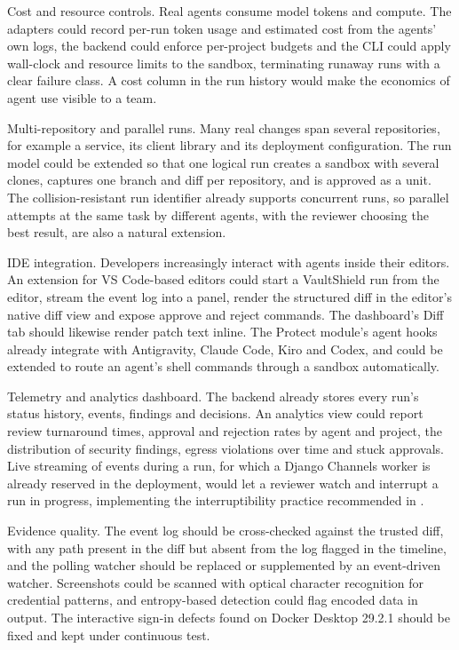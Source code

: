 \documentclass[12pt,a4paper,oneside]{report}
\begin{document}
Cost and resource controls. Real agents consume model tokens and compute. The adapters could record per-run token usage and estimated cost from the agents' own logs, the backend could enforce per-project budgets and the CLI could apply wall-clock and resource limits to the sandbox, terminating runaway runs with a clear failure class. A cost column in the run history would make the economics of agent use visible to a team.

Multi-repository and parallel runs. Many real changes span several repositories, for example a service, its client library and its deployment configuration. The run model could be extended so that one logical run creates a sandbox with several clones, captures one branch and diff per repository, and is approved as a unit. The collision-resistant run identifier already supports concurrent runs, so parallel attempts at the same task by different agents, with the reviewer choosing the best result, are also a natural extension.

IDE integration. Developers increasingly interact with agents inside their editors. An extension for VS Code-based editors could start a VaultShield run from the editor, stream the event log into a panel, render the structured diff in the editor's native diff view and expose approve and reject commands. The dashboard's Diff tab should likewise render patch text inline. The Protect module's agent hooks already integrate with Antigravity, Claude Code, Kiro and Codex, and could be extended to route an agent's shell commands through a sandbox automatically.

Telemetry and analytics dashboard. The backend already stores every run's status history, events, findings and decisions. An analytics view could report review turnaround times, approval and rejection rates by agent and project, the distribution of security findings, egress violations over time and stuck approvals. Live streaming of events during a run, for which a Django Channels worker is already reserved in the deployment, would let a reviewer watch and interrupt a run in progress, implementing the interruptibility practice recommended in \cite{ref9}.

Evidence quality. The event log should be cross-checked against the trusted diff, with any path present in the diff but absent from the log flagged in the timeline, and the polling watcher should be replaced or supplemented by an event-driven watcher. Screenshots could be scanned with optical character recognition for credential patterns, and entropy-based detection could flag encoded data in output. The interactive sign-in defects found on Docker Desktop 29.2.1 should be fixed and kept under continuous test.
\end{document}
